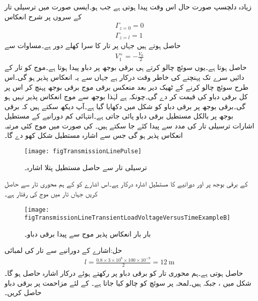 زیادہ دلچسپ صورت حال اس وقت پیدا ہوتی ہے جب  ہو۔ایسی صورت میں ترسیلی تار کے سروں پر شرح انعکاس
\begin{align*}
\Gamma_{z=0}=0\\
\Gamma_{z=l}=1
\end{align*}
حاصل ہوتے ہیں جہاں  پر تار کا سرا کھلے دور ہے۔مساوات  سے
\begin{align*}
V_1^+=-\frac{V_0}{2}
\end{align*}
حاصل ہوتا ہے۔یوں سوئچ چالو کرتے ہی برقی بوجھ پر دباو  پیدا ہوتا ہے۔موج  کو تار کے دائیں سرے تک پہنچنے کی خاطر  وقت درکار ہے جہاں سے یہ انعکاس پذیر ہو گی۔اس طرح سوئچ چالو کرنے کے ٹھیک  دیر بعد منعکس برقی موج برقی  بوجھ پہنچ کر اس پر کل برقی دباو کی قیمت  کر دے گی۔چونکہ  ہے لہٰذا  بوجھ سے موج انعکاس پذیر نہیں ہو گی۔برقی  بوجھ پر برقی دباو کو شکل  میں دکھایا گیا ہے۔آپ دیکھ سکتے ہیں کہ برقی بوجھ پر بالکل مستطیل برقی دباو پائی جاتی ہے۔انتہائی کم دورانیے کے مستطیل اشارات ترسیلی تار کی مدد سے پیدا کئے جا سکتے ہیں۔ کی صورت میں موج کئی مرتبہ انعکاس پذیر ہو گی جس سے اشارہ مستطیل شکل کھو دے گا۔
\begin{figure}
\centering
\texttt{[image: figTransmissionLinePulse]}
\caption{ترسیلی تار سے حاصل مستطیل پتلا اشارہ۔}
\label{شکل_ترسیلی_تار_سے_حاصل_مستطیل_اشارہ}
\end{figure}


 کے برقی بوجھ پر  اور  دورانیے کا مستطیل اشارہ درکار ہے۔اس اشارے کو  کے ہم محوری تار سے حاصل کریں جہاں تار میں موج کی رفتار  ہے۔
\begin{figure}
\centering
\texttt{[image: figTransmissionLineTransientLoadVoltageVersusTimeExampleB]}
\caption{بار بار انعکاس پذیر موج سے پیدا برقی دباو۔}
\label{شکل_ترسیلی_تار_بار_بار_انعکاس}
\end{figure}

حل:اشارے کے دورانیے سے تار کی لمبائی
\begin{align*}
l=\frac{0.8 \times 3 \times 10^8 \times 100 \times 10^{-9}}{2}=\SI{12}{\meter}
\end{align*}
حاصل ہوتی ہے۔ہم محوری تار کو  برقی دباو پر رکھتے ہوئے درکار اشارہ حاصل ہو گا۔
شکل  میں ،   جبکہ  ہیں۔لمحہ  پر سوئچ کو چالو کیا جاتا ہے۔ کے لئے مزاحمت پر برقی دباو حاصل کریں۔

